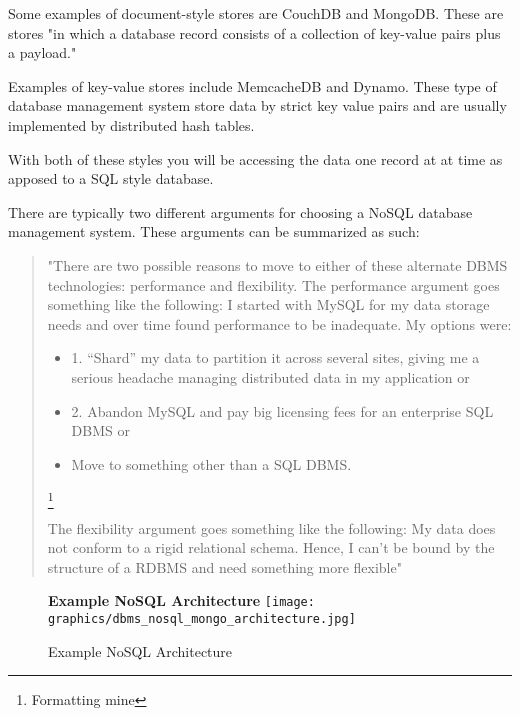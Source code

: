 \documentclass[letterpaper, 12pt]{article}
\begin{document}
Some examples of document-style stores are CouchDB and MongoDB. These are stores
"in which a database record consists of a collection of key-value pairs plus a payload."
\cite{stonebraker2010sql}
\par\vspace{\baselineskip}
Examples of key-value stores include MemcacheDB and Dynamo. These type of database
management system store data by strict key value pairs and are usually implemented by
distributed hash tables.
\par\vspace{\baselineskip}
With both of these styles you will be accessing the data one record at
at time as apposed to a SQL style database.
\par\vspace{\baselineskip}
There are typically two different arguments for choosing a NoSQL database management
system. These arguments can be summarized as such:

\begin{quote}
"There are two possible reasons
to move to either of these alternate
DBMS technologies: performance and
flexibility.
The performance argument goes
something like the following: I started
with MySQL for my data storage needs
and over time found performance to be
inadequate. My options were:

\begin{itemize}
  \item 1. “Shard” my data to partition it
across several sites, giving me a serious
headache managing distributed data
in my application or
  \item 2. Abandon MySQL and pay big licensing
fees for an enterprise SQL
DBMS or
\item Move to something other
than a SQL DBMS.
\end{itemize}\footnote{Formatting mine}

The flexibility argument goes something
like the following: My data does
not conform to a rigid relational schema.
Hence, I can’t be bound by the
structure of a RDBMS and need something
more flexible"
\end{quote} \cite{stonebraker2010sql}

\begin{figure}
  \centering
  \textbf{Example NoSQL Architecture}
  \texttt{[image: graphics/dbms\_nosql\_mongo\_architecture.jpg]}
  \caption{Example NoSQL Architecture}
  \citep{mongodb_architecture}
\end{figure}
\end{document}
